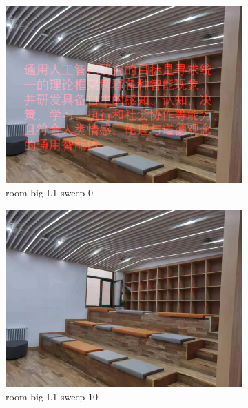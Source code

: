 \documentclass[11pt]{article}
\begin{document}
\begin{figure}[ht!]
    \centering
    \hfill%
    \begin{subfigure}[]{0.333\linewidth}
        \centering
        \includegraphics[width=\linewidth]{fig/restoration/room_big/L1/gibbs_0.jpg}
        \caption{room big L1 sweep 0}
    \end{subfigure}%
    \hfill%
    \begin{subfigure}[]{0.333\linewidth}
        \centering
        \includegraphics[width=\linewidth]{fig/restoration/room_big/L1/gibbs_10.jpg}
        \caption{room big L1 sweep 10}
    \end{subfigure}%
    \hfill%
    \begin{subfigure}[]{0.333\linewidth}

\end{subfigure}
\end{figure}
\end{document}
